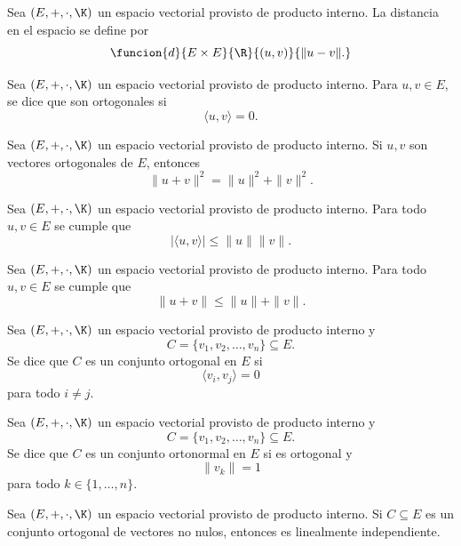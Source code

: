 \documentclass[a4,11pt]{aleph-notas}
\begin{document}
\begin{defi}
    Sea $(E,+,\cdot,\K)$ un espacio vectorial provisto de producto interno. La distancia en el espacio se define por
    \[
        \funcion{d}{E\times E}{\R}{(u,v)}{\| u - v\|.}
    \]
\end{defi}


\begin{teo}
    Sea $(E,+,\cdot,\K)$ un espacio vectorial provisto de producto interno. Para  $u,v\in E$, se dice que son ortogonales si
    \[
        \langle u , v \rangle = 0.
    \]
\end{teo}


\begin{teo}
    Sea $(E,+,\cdot,\K)$ un espacio vectorial provisto de producto interno.
    Si $u,v$ son vectores ortogonales de $E$, entonces
    \[
        \| u + v \|^2 = \|u\|^2 + \|v\|^2.
    \]
\end{teo}

\begin{teo}
    Sea $(E,+,\cdot,\K)$ un espacio vectorial provisto de producto interno.
    Para todo $u,v\in E$ se cumple que
    \[
        | \langle u , v \rangle | \leq \|u\|  \|v\|.
    \]
\end{teo}

\begin{teo}
    Sea $(E,+,\cdot,\K)$ un espacio vectorial provisto de producto interno.
    Para todo $u,v\in E$ se cumple que
    \[
        \| u + v \| \leq \|u\| + \|v\|.
    \]
\end{teo}


\begin{defi}
    Sea $(E,+,\cdot,\K)$ un espacio vectorial provisto de producto interno y
    \[C=\{v_1, v_2, \ldots, v_n\}\subseteq E.\] Se dice que $C$ es un conjunto ortogonal en $E$ si
    \[
        \langle v_i, v_j \rangle = 0
    \]
    para todo $i \neq j$.
\end{defi}

\begin{defi}
    Sea $(E,+,\cdot,\K)$ un espacio vectorial provisto de producto interno y
    \[C = \{v_1, v_2, \ldots, v_n\} \subseteq E.\] Se dice que $C$ es un conjunto ortonormal en $E$ si es ortogonal y 
    \[
        \| v_k\| =  1
    \]
    para todo $k \in \{1, \ldots, n\}$.
\end{defi}


\begin{teo}
    Sea $(E,+,\cdot,\K)$ un espacio vectorial provisto de producto interno. Si $C \subseteq E$ es un conjunto ortogonal de vectores no nulos, entonces es linealmente independiente.
\end{teo}
\end{document}

